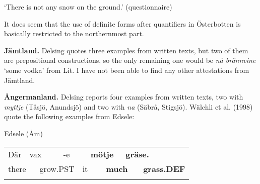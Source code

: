 \begin{styleTranslation}
‘There is not any snow on the ground.’ (questionnaire)

\end{styleTranslation}

\begin{styleBodyTextFirst}
It does seem that the use of definite forms after quantifiers in Österbotten is basically restricted to the northernmost part.

\end{styleBodyTextFirst}

\begin{styleBodytextC}
\textbf{Jämtland. }Delsing quotes three examples from written texts, but two of them are prepositional constructions, so the only remaining one would be \textit{nå brännvine} ‘some vodka’ from Lit. I have not been able to find any other attestations from Jämtland.

\end{styleBodytextC}

\begin{styleBodytextC}
\textbf{Ångermanland.} Delsing reports four examples from written texts, two with \textit{myttje} (Tåsjö, Anundsjö) and two with \textit{na }(Säbrå, Stigsjö). Wälchli et al. (1998) quote the following examples from Edsele:

\end{styleBodytextC}

\begin{listWWNumileveli}
\item 

\begin{styleExample}
Edsele (Åm)

\end{styleExample}

\end{listWWNumileveli}

\begin{listWWNumxxxviiileveli}
\item 

\end{listWWNumxxxviiileveli}

\begin{tabular}{llllllllll}
\lsptoprule
Där & \multicolumn{2}{l}{vax

} & \multicolumn{2}{l}{{}-e

} & \multicolumn{2}{l}{{\bfseries mötje}

} & \multicolumn{2}{l}{{\bfseries gräse.}

} & \\
\multicolumn{2}{l}{there

} & \multicolumn{2}{l}{grow.PST

} & \multicolumn{2}{l}{it

} & \multicolumn{2}{l}{{\bfseries much}

} & \multicolumn{2}{l}{{\bfseries grass.DEF}

}\\
\lspbottomrule
\end{tabular}

